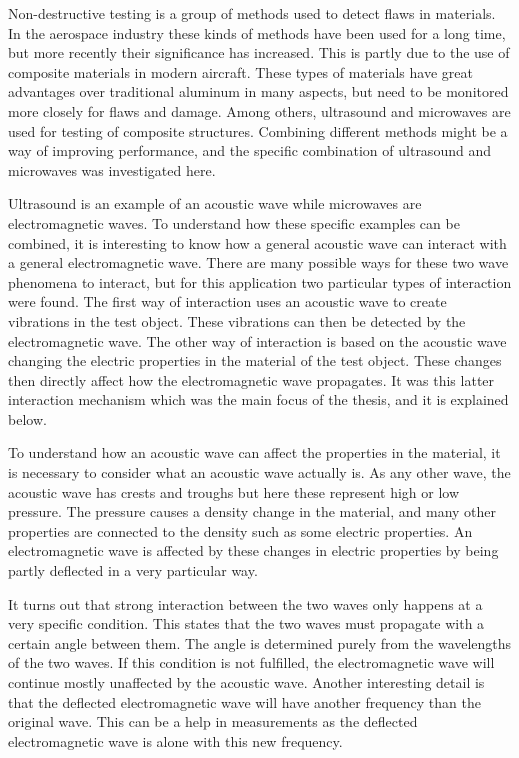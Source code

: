 \documentclass[11pt]{article}
\begin{document}
	\begin{multicols}{2}		
		\noindent
		Non-destructive testing is a group of methods used to detect flaws in materials. In the aerospace industry these kinds of methods have been used for a long time, but more recently their significance has increased. This is partly due to the use of composite materials in modern aircraft. These types of materials have great advantages over traditional aluminum in many aspects, but need to be monitored more closely for flaws and damage. Among others, ultrasound and microwaves are used for testing of composite structures. Combining different methods might be a way of improving performance, and the specific combination of ultrasound and microwaves was investigated here.
		
		Ultrasound is an example of an acoustic wave while microwaves are electromagnetic waves. To understand how these specific examples can be combined, it is interesting to know how a general acoustic wave can interact with a general electromagnetic wave. There are many possible ways for these two wave phenomena to interact, but for this application two particular types of interaction were found. The first way of interaction uses an acoustic wave to create vibrations in the test object. These vibrations can then be detected by the electromagnetic wave. The other way of interaction is based on the acoustic wave changing the electric properties in the material of the test object. These changes then directly affect how the electromagnetic wave propagates. It was this latter interaction mechanism which was the main focus of the thesis, and it is explained below.
		
		To understand how an acoustic wave can affect the properties in the material, it is necessary to consider what an acoustic wave actually is. As any other wave, the acoustic wave has crests and troughs but here these represent high or low pressure. The pressure causes a density change in the material, and many other properties are connected to the density such as some electric properties. An electromagnetic wave is affected by these changes in electric properties by being partly deflected in a very particular way.
		
		It turns out that strong interaction between the two waves only happens at a very specific condition. This states that the two waves must propagate with a certain angle between them. The angle is determined purely from the wavelengths of the two waves. If this condition is not fulfilled, the electromagnetic wave will continue mostly unaffected by the acoustic wave. Another interesting detail is that the deflected electromagnetic wave will have another frequency than the original wave. This can be a help in measurements as the deflected electromagnetic wave is alone with this new frequency.
		

\end{multicols}
\end{document}
